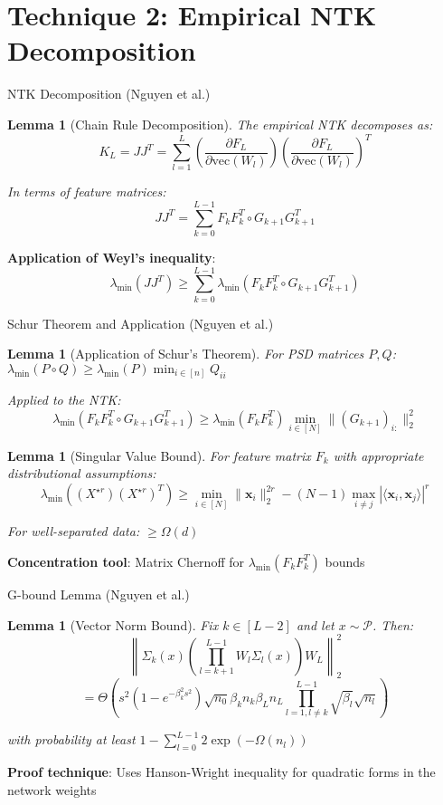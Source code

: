 \documentclass{beamer}
\newtheorem{lemma}[theorem]{Lemma}
\newcommand{\evmin}[1]{\lambda_{\min}\left(#1\right)}
\newcommand{\x}{\mathbf{x}}
\newcommand{\bigOmg}{\Omega}
\newcommand{\bigTheta}{\Theta}
\begin{document}
\section{Technique 2: Empirical NTK Decomposition}

\begin{frame}{NTK Decomposition (Nguyen et al.)}
  \begin{lemma}[Chain Rule Decomposition]
  The empirical NTK decomposes as:
  $$K_L = JJ^T = \sum_{l=1}^L \left(\frac{\partial F_L}{\partial \text{vec}(W_l)}\right) \left(\frac{\partial F_L}{\partial \text{vec}(W_l)}\right)^T$$
  
  In terms of feature matrices:
  $$JJ^T = \sum_{k=0}^{L-1} F_k F_k^T \circ G_{k+1} G_{k+1}^T$$
  \end{lemma}
  
  \textbf{Application of Weyl's inequality}:
  $$\evmin{JJ^T} \geq \sum_{k=0}^{L-1} \evmin{F_k F_k^T \circ G_{k+1} G_{k+1}^T}$$
\end{frame}

\begin{frame}{Schur Theorem and Application (Nguyen et al.)}
  \begin{lemma}[Application of Schur's Theorem]
  For PSD matrices $P, Q$: $\evmin{P \circ Q} \geq \evmin{P} \min_{i \in [n]} Q_{ii}$
  
  Applied to the NTK:
  $$\evmin{F_k F_k^T \circ G_{k+1} G_{k+1}^T} \geq \evmin{F_k F_k^T} \min_{i \in [N]} \|(G_{k+1})_{i:}\|_2^2$$
  \end{lemma}
  
  \begin{lemma}[Singular Value Bound]
  For feature matrix $F_k$ with appropriate distributional assumptions:
  $$\evmin{(X^{\star r})(X^{\star r})^T} \geq \min_{i \in [N]} \|\x_i\|_2^{2r} - (N-1) \max_{i \neq j} |\langle \x_i, \x_j \rangle|^r$$
  
  For well-separated data: $\geq \Omega(d)$
  \end{lemma}
  
  \textbf{Concentration tool}: Matrix Chernoff for $\evmin{F_k F_k^T}$ bounds
\end{frame}

\begin{frame}{G-bound Lemma (Nguyen et al.)}
  \begin{lemma}[Vector Norm Bound]
  Fix $k \in [L-2]$ and let $x \sim \mathcal{P}$. Then:
  $$\left\|\Sigma_k(x)\left(\prod_{l=k+1}^{L-1}W_l\Sigma_l(x)\right)W_L\right\|_2^2$$
  $$= \bigTheta\left(s^2(1 - e^{-\beta_k^2s^2})\sqrt{n_0}\beta_kn_k\beta_{L}n_L\prod_{l=1, l\neq k}^{L-1}\sqrt{\beta_l}\sqrt{n_l}\right)$$
  
  with probability at least $1 - \sum_{l=0}^{L-1}2\exp(-\bigOmg(n_l))$
  \end{lemma}
  
  \textbf{Proof technique}: Uses Hanson-Wright inequality for quadratic forms in the network weights
\end{frame}
\end{document}
